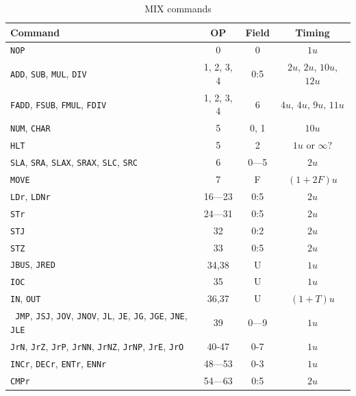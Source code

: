\documentclass[a4paper,ngerman]{scrartcl}
\begin{document}
\begin{table}
	\centering
	\label{tab:commands}
\caption{	MIX commands}
\begin{tabular}{|l|c|c|c|}

	\hline 
	\textbf{Command} & \textbf{OP} & \textbf{Field} & \textbf{Timing} \\ 
	\hline 
 \lstinline|NOP|     & 0   & 0     & $1u$     \\
	\hline 
 \lstinline|ADD|, \lstinline|SUB|, \lstinline|MUL|, \lstinline|DIV|     & 1, 2, 3, 4   & 0:5   & $2u$, $2u$, $10u$, $12u$     \\
 	\hline 
 \lstinline|FADD|, \lstinline|FSUB|, \lstinline|FMUL|, \lstinline|FDIV|   & 1, 2, 3, 4   & 6     & $4u$, $4u$, $9u$, $11u$     \\
 	\hline 
 \lstinline|NUM|, \lstinline|CHAR|& 5   & 0, 1   & $10u$    \\
 	\hline 
 \lstinline|HLT|     & 5   & 2     & $1u$ or $\infty$?   \\
 	\hline 
 \lstinline|SLA|, \lstinline|SRA|, \lstinline|SLAX|, \lstinline|SRAX|, \lstinline|SLC|, \lstinline|SRC|& 6  & 0---5&  $2u$     \\
 	\hline 
 \lstinline|MOVE|    & 7   & F     & $(1+2F)u$\\
 	\hline 
 \lstinline|LDr|, \lstinline|LDNr|    &16---23&0:5   & $2u$     \\
 	\hline 
 \lstinline|STr|     &24---31& 0:5   & $2u$     \\
 	\hline 
 \lstinline|STJ|     & 32  & 0:2   & $2u$     \\
 	\hline 
 \lstinline|STZ|     & 33  & 0:5   & $2u$     \\
	\hline 
\lstinline|JBUS|, \lstinline|JRED|&34,38& U     & $1u$     \\
	\hline 
 \lstinline|IOC|     & 35  & U     & $1u$     \\
	\hline 
 \lstinline|IN|, \lstinline|OUT|  &36,37& U     & $(1+T)u$ \\
	\hline 
\lstinline| JMP|, \lstinline|JSJ|, \lstinline|JOV|, \lstinline|JNOV|, \lstinline|JL|, \lstinline|JE|, \lstinline|JG|, \lstinline|JGE|, \lstinline|JNE|, \lstinline|JLE|& 39  &0---9  & $1u$   \\
 	\hline 
 \lstinline|JrN|, \lstinline|JrZ|, \lstinline|JrP|, \lstinline|JrNN|, \lstinline|JrNZ|, \lstinline|JrNP|, \lstinline|JrE|, \lstinline|JrO| & 40-47& 0-7 & 	$1u$ \\
	\hline 
 \lstinline|INCr|, \lstinline|DECr|, \lstinline|ENTr|, \lstinline|ENNr|  & 48---53   &0-3     & $1u$   \\
	\hline 
 \lstinline|CMPr| & 54---63&0:5          & $2u$   \\
	\hline 
\end{tabular} 
\end{table}
\end{document}
